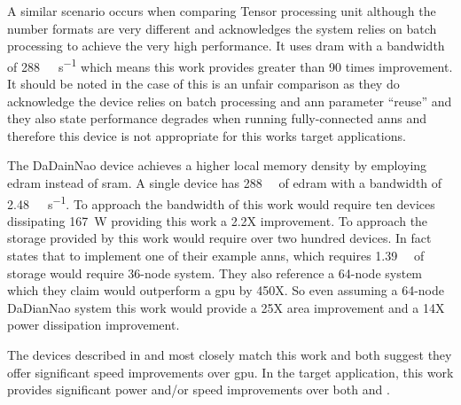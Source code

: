 A similar scenario occurs when comparing Tensor processing unit \cite{tensorflow2015-whitepaper} although the number formats are very different and \cite{tensorflow2015-whitepaper} acknowledges the system relies on batch processing to achieve the very high performance.
It uses \ac{dram} with a bandwidth of \SI[per-mode=symbol]{288}{\giga\bit\per\second} which means this work provides greater than 90 times improvement. 
It should be noted in the case of \cite{tensorflow2015-whitepaper} this is an unfair comparison as they do acknowledge the device relies on batch processing and \ac{ann} parameter ``reuse'' and they also state performance degrades when running fully-connected \acp{ann} and therefore this device is not appropriate for this works target applications.

The DaDainNao \cite{chen2016diannao} device achieves a higher local memory density by employing \ac{edram} instead of \ac{sram}. A single device has \SI[per-mode=symbol]{288}{\giga\bit} of \ac{edram} with a bandwidth of \SI[per-mode=symbol]{2.48}{\tera\bit\per\second}.
To approach the bandwidth of this work would require ten devices dissipating \SI[per-mode=symbol]{167}{\watt} providing this work a 2.2X improvement.
To approach the storage provided by this work would require over two hundred devices. 
In fact \cite{chen2016diannao} states that to implement one of their example \acp{ann}, which requires \SI[per-mode=symbol]{1.39}{\giga\byte} of storage would require 36-node system. 
They also reference a 64-node system which they claim would outperform a \ac{gpu} by 450X.
So even assuming a 64-node DaDianNao system this work would provide a 25X area improvement and a 14X power dissipation improvement.

The devices described in \cite{chen2016diannao} and \cite{azarkhish2017neurostream} most closely match this work and both suggest they offer significant speed improvements over \ac{gpu}.
In the target application, this work provides significant power and/or speed improvements over both \cite{chen2016diannao} and \cite{azarkhish2017neurostream}.




